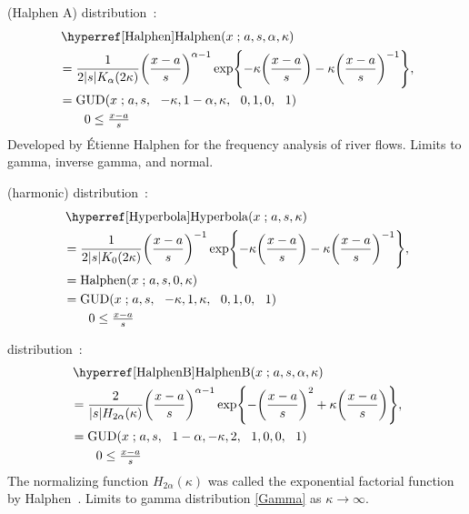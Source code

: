  (Halphen A) distribution~\cite{Halphen1941}:
\begin{align}
\label{Halphen}
&\opr{Halphen}(x\given a,s, \alpha, \kappa) 
\\
&= \frac{1}{2 |s| K_{\alpha} (2\kappa)} \Left(\frac{x-a}{s}\Right)^{\alpha-1} 
\exp\Left\{-\kappa \Left(\frac{x-a}{s}\Right) -\kappa \Left(\frac{x-a}{s}\Right)^{-1}\Right\},
\checked
\notag
\\
 &=  \op{GUD}(x\given a,s \sep -\kappa, 1-\alpha, \kappa\sep 0,1,0 \sep 1)
\notag
\checked
\\& \qquad  0 \leq \tfrac{x-a}{s}
\notag
\end{align}
Developed by \'Etienne Halphen for the frequency analysis of river flows.
Limits to gamma, inverse gamma, and normal.



 (harmonic) distribution~\cite{Halphen1941,Perreault1999}:
\begin{align}
\label{Hyperbola}
&\opr{Hyperbola}(x\given a,s,\kappa) 
\\ 
&= \frac{1}{2 |s| K_0(2\kappa)} \Left(\frac{x-a}{s}\Right)^{-1} 
\exp \Left\{ -\kappa \Left(\frac{x-a}{s}\Right) -\kappa \Left(\frac{x-a}{s}\Right)^{-1} \Right\},
\checked
\notag
\\
& = \op{Halphen}(x\given a,s, 0, \kappa) 
\checked
\notag
\\
& = \op{GUD}(x\given a,s\sep -\kappa, 1 , \kappa\sep 0,1,0\sep 1) 
\checked
\notag
\\& \qquad  0 \leq \tfrac{x-a}{s}
\notag
\end{align}




 distribution~\cite{Halphen1941,Perreault1999}:
\begin{align}
\label{HalphenB}
&\opr{HalphenB}(x\given a,s, \alpha, \kappa) 
\\
&= \frac{2}{|s| H_{2 \alpha}(\kappa)} \Left(\frac{x-a}{s}\Right)^{\alpha-1} 
\exp\Left\{- \Left(\frac{x-a}{s}\Right)^{2} +\kappa \Left(\frac{x-a}{s}\Right)\Right\},
\checked
\notag
\\
& = \op{GUD}(x\given a,s\sep 1-\alpha, -\kappa,  2\sep 1,0,0\sep 1) \checked
\notag
\\& \qquad  0 \leq \tfrac{x-a}{s}
\notag
\end{align}
The normalizing function $H_{2 \alpha}(\kappa)$ was called the exponential factorial function by Halphen~\cite{Halphen1955a, Perreault1999}.
Limits to gamma distribution \eqref{Gamma} as $\kappa \rightarrow \infty$.

